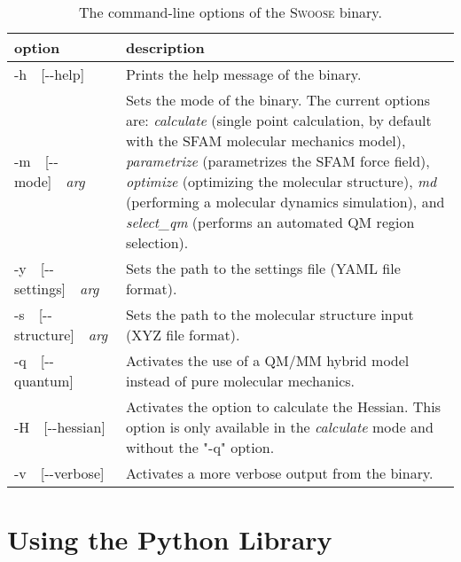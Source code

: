 \documentclass[]{tufte-book}
\begin{document}
\begin{table}[h]
\renewcommand{\baselinestretch}{1.3}
\renewcommand{\arraystretch}{1.3}
\caption{\label{tab:command_line_options} \small The command-line options of the
\textsc{Swoose} binary.}
\begin{center}
\begin{tabular}{L{3.3cm} L{6.7cm}}
\hline
\hline
 option & description \\
\hline
-h~~[-{}-help] & Prints the help message of the binary. \\
-m~~[-{}-mode]~~\textit{arg} & Sets the mode of the binary. The current options are: \textit{calculate} (single point calculation, by default with the SFAM molecular mechanics model),
\textit{parametrize} (parametrizes the SFAM force field), \textit{optimize} (optimizing the molecular structure), \textit{md} (performing a molecular dynamics simulation), and \textit{select\_qm} (performs an automated QM region selection). \\
-y~~[-{}-settings]~~\textit{arg} & Sets the path to the settings file (YAML file format). \\
-s~~[-{}-structure]~~\textit{arg} & Sets the path to the molecular structure input (XYZ file format). \\
-q~~[-{}-quantum] & Activates the use of a QM/MM hybrid model instead of pure molecular mechanics.\\
-H~~[-{}-hessian] & Activates the option to calculate the Hessian. This option is only available in the \textit{calculate} mode and without the "-q" option. \\
-v~~[-{}-verbose] & Activates a more verbose output from the binary. \\
\hline
\hline
\end{tabular}
\renewcommand{\baselinestretch}{1.0}
\renewcommand{\arraystretch}{1.0}
\end{center}
\end{table}


\chapter{Using the Python Library}
\end{document}
